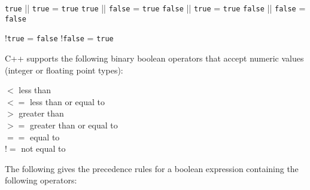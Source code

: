 {{{{{\begin{center}
\verb!true! || \verb!true!  = \verb!true!
\verb!true! || \verb!false!  = \verb!true!
\verb!false! || \verb!true!  = \verb!true!
\verb!false! || \verb!false!  = \verb!false!

!\verb!true!  = \verb!false!
!\verb!false!  = \verb!true!
\end{center}

C++ supports the following binary boolean operators that accept numeric
values (integer or floating point types):

\begin{center}
  $<$   less than\\
  $<=$  less than or equal to\\
  $>$   greater than\\
  $>=$  greater than or equal to\\
  $==$  equal to\\
  $!=$  not equal to\\
\end{center}

The following gives the precedence rules for a boolean expression
containing the following operators:

}}}}}

